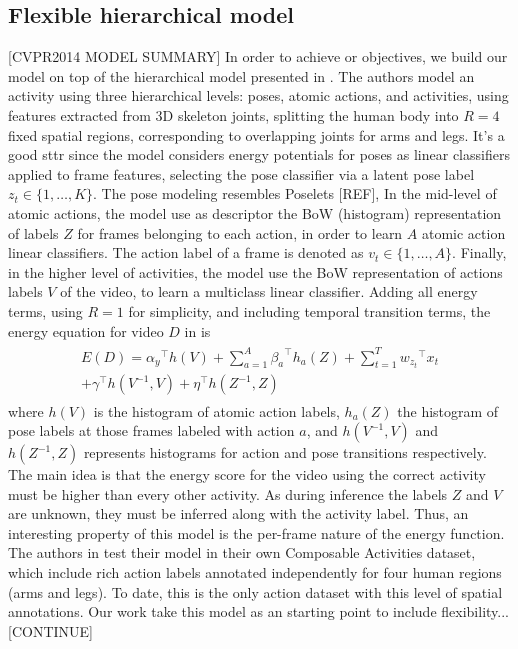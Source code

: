 \subsection{Flexible hierarchical model}
[CVPR2014 MODEL SUMMARY] In order to achieve or objectives, we build our model on top of the hierarchical model presented in \cite{Lillo2014}.
The authors model an activity using three hierarchical levels: poses, atomic actions, and activities, using features extracted from 3D skeleton joints, splitting the human body into $R=4$ fixed spatial regions, corresponding to overlapping joints for arms and legs. It's a good sttr since the model considers energy potentials for poses as linear classifiers applied to frame features, selecting the pose classifier via a latent pose label $z_t \in \{1,\dots,K\}$. The pose modeling resembles Poselets [REF], In the mid-level of atomic actions, the model use as descriptor the BoW (histogram) representation of labels $Z$ for frames belonging to each action, in order to learn $A$ atomic action linear classifiers. The action label of a frame is denoted as $v_t \in \{1,\dots,A\}$. Finally, in the higher level of activities, the model use the BoW representation of actions labels $V$ of the video, to learn a multiclass linear classifier. Adding all energy terms, using $R=1$ for simplicity, and including temporal transition terms, the energy equation for video $D$ in \cite{Lillo2014} is 
%
\begin{eqnarray}
\label{eq:energy2014}
\begin{split}
E(D) =  {\alpha_y}^\top h(V) + \sum_{a=1}^A {\beta_a}^\top h_a(Z) + \sum_{t=1}^T {w_{z_t}}^\top x_t  \\+ {\gamma}^\top h(V^{-1},V) + {\eta}^\top h(Z^{-1},Z)
\end{split}
\end{eqnarray}
%
where $h(V)$ is the histogram of atomic action labels, $h_a(Z)$ the histogram of pose labels at those frames labeled with action $a$, and $h(V^{-1},V)$ and $h(Z^{-1},Z)$ represents histograms for action and pose transitions respectively. The main idea is that the energy score for the video using the correct activity must be higher than every other activity. As during inference the labels $Z$ and $V$ are unknown, they must be inferred along with the activity label. Thus, an interesting property of this model is the per-frame nature of the energy function. The authors in \cite{Lillo2014} test their model in their own Composable Activities dataset, which include rich action labels annotated independently for four human regions (arms and legs). To date, this is the only action dataset with this level of spatial annotations. Our work take this model as an starting point to include flexibility... [CONTINUE]


